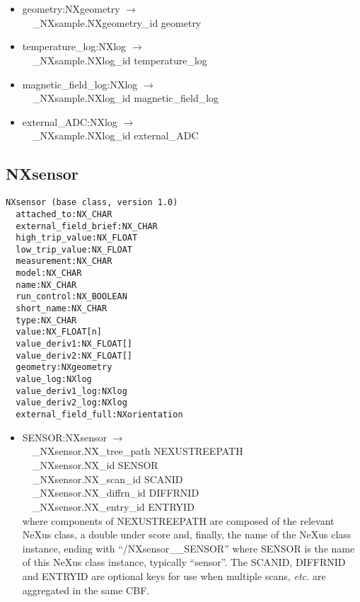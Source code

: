\documentclass[11pt]{article}
\begin{document}
{{\begin{itemize}
\item{geometry:NXgeometry $\rightarrow$\\
\verb|  |\_NXsample.NXgeometry\_id geometry}

\item{temperature\_log:NXlog $\rightarrow$\\
\verb|  |\_NXsample.NXlog\_id temperature\_log}

\item{magnetic\_field\_log:NXlog $\rightarrow$\\
\verb|  |\_NXsample.NXlog\_id magnetic\_field\_log}

\item{external\_ADC:NXlog $\rightarrow$\\
\verb|  |\_NXsample.NXlog\_id external\_ADC}
\end{itemize}
\subsection{NXsensor}

\begin{verbatim}
NXsensor (base class, version 1.0)
  attached_to:NX_CHAR
  external_field_brief:NX_CHAR
  high_trip_value:NX_FLOAT
  low_trip_value:NX_FLOAT
  measurement:NX_CHAR
  model:NX_CHAR
  name:NX_CHAR
  run_control:NX_BOOLEAN
  short_name:NX_CHAR
  type:NX_CHAR
  value:NX_FLOAT[n]
  value_deriv1:NX_FLOAT[]
  value_deriv2:NX_FLOAT[]
  geometry:NXgeometry
  value_log:NXlog
  value_deriv1_log:NXlog
  value_deriv2_log:NXlog
  external_field_full:NXorientation
\end{verbatim}

\begin{itemize}

\item{SENSOR:NXsensor $\rightarrow$\\
\verb|  |\_NXsensor.NX\_tree\_path    NEXUSTREEPATH \\
\verb|  |\_NXsensor.NX\_id            SENSOR\\
\verb|  |\_NXsensor.NX\_scan\_id      SCANID \\
\verb|  |\_NXsensor.NX\_diffrn\_id    DIFFRNID \\
\verb|  |\_NXsensor.NX\_entry\_id     ENTRYID \\
where components of NEXUSTREEPATH are composed of the
relevant NeXus class, a double under score and, finally, the
name of the NeXus class instance, ending with ``/NXsensor\_\_SENSOR''
where SENSOR is the name of this NeXus class instance, typically ``sensor''.
The SCANID, DIFFRNID and ENTRYID are optional keys for use
when multiple scans, {\it etc.} are aggregated in the same CBF.}


\end{itemize}}}
\end{document}
